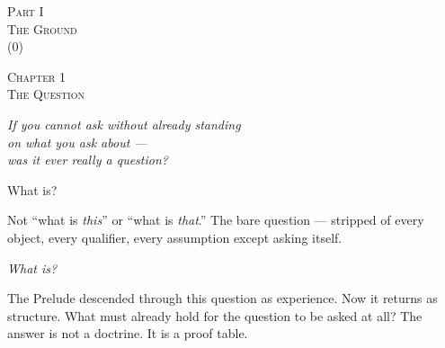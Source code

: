 \documentclass[10pt, openany, oneside]{book}
\renewcommand{\normalsize}{\fontsize{10}{13}\selectfont}
\renewcommand{\large}{\fontsize{11.5}{14}\selectfont}
\renewcommand{\LARGE}{\fontsize{15}{18}\selectfont}
\renewcommand{\huge}{\fontsize{17}{21}\selectfont}
\begin{document}
\newpage
\thispagestyle{empty}
\vspace*{\fill}
\begin{center}
    {\LARGE\scshape Part I}\\[1em]
    {\large\scshape The Ground}\\[0.5em]
    {\normalsize (0)}
\end{center}
\vspace*{\fill}
\newpage

%
%
%

\newpage

\begin{center}
    {\huge\scshape Chapter 1}\\[0.3em]
    {\large\scshape The Question}
\end{center}

\vspace{1.5em}

\begin{center}
    \itshape
    If you cannot ask without already standing\\
    on what you ask about ---\\
    was it ever really a question?
\end{center}

\vspace{2em}


\noindent What is?

Not ``what is \textit{this}'' or ``what is \textit{that}.'' The bare question --- stripped of every object, every qualifier, every assumption except asking itself.

\textit{What is?}

The Prelude descended through this question as experience. Now it returns as structure. What must already hold for the question to be asked at all? The answer is not a doctrine. It is a proof table.

\vspace{1.5em}

\end{document}
